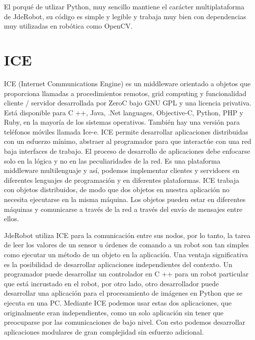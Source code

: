 El porqué de utlizar Python, muy sencillo mantiene el carácter multiplataforma de JdeRobot, su c\'odigo es simple y legible y trabaja muy bien con dependencias muy utilizadas en rob\'otica como OpenCV.

\section{ICE}
\label{sec:ICE}
ICE (Internet Communications Engine) es un middleware orientado a objetos que proporciona llamadas a procedimientos remotos, grid computing y funcionalidad cliente / servidor desarrollada por ZeroC bajo GNU GPL y una licencia privativa. Está disponible para C ++,
Java, .Net languages, Objective-C, Python, PHP y Ruby, en la mayoría de los sistemas operativos. También hay una versión para teléfonos móviles llamada Ice-e. ICE permite desarrollar aplicaciones distribuidas con un esfuerzo mínimo, abstraer al programador para que interactúe con una red baja interfaces de trabajo. El proceso de desarrollo de aplicaciones debe enfocarse solo en la lógica y no en las peculiaridades de la red. Es una plataforma middleware multilenguaje y así, podemos implementar clientes y servidores en diferentes lenguajes de programación y en diferentes plataformas. ICE trabaja con objetos distribuidos, de modo que dos objetos en nuestra aplicación no necesita ejecutarse en la misma máquina. Los objetos pueden estar en diferentes máquinas y comunicarse a través de la red a través del envío de mensajes entre ellos.

JdeRobot utiliza ICE para la comunicación entre sus nodos, por lo tanto, la tarea de leer
los valores de un sensor u órdenes de comando a un robot son tan simples como ejecutar un método de un objeto en la aplicación. Una ventaja significativa es la posibilidad de desarrollar aplicaciones independientes del contexto. Un programador puede desarrollar un controlador en C ++ para un robot particular que está incrustado en el robot, por otro lado, otro desarrollador puede desarrollar una aplicación para el procesamiento de imágenes en Python que se ejecuta en una PC. Mediante ICE podemos usar estas dos aplicaciones, que originalmente eran independientes, como un solo aplicación sin tener que preocuparse por las comunicaciones de bajo nivel. Con esto podemos desarrollar aplicaciones modulares de gran complejidad sin esfuerzo adicional.

\cleardoublepage